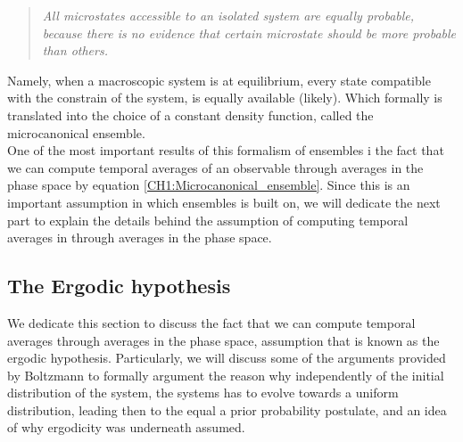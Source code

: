 \begin{quote}
\textit{All microstates accessible to an isolated system are equally probable, because there is no evidence that certain microstate should be more probable than others.}
\end{quote}
\indent Namely, when a macroscopic system is at equilibrium, every state compatible with the constrain of the system, is equally available (likely). Which formally is translated into the choice of a constant density function, called the microcanonical ensemble.\\
\indent One of the most important results of this formalism of ensembles i the fact that we can compute temporal averages of an observable through averages in the phase space by equation \eqref{CH1:Microcanonical_ensemble}. Since this is an important assumption in which ensembles is built on, we will dedicate the next part to explain the details behind the assumption of computing temporal averages in through averages in the phase space.
\subsection{The Ergodic hypothesis} 

We dedicate this section to discuss the fact that we can compute temporal averages through averages in the phase space,  assumption that is known as the ergodic hypothesis. Particularly, we will discuss some of the arguments provided by Boltzmann  \cite{boltzmann_zur_1871, boltzmann_einige_1871} to formally argument the reason why independently of the initial distribution of the system, the systems has to evolve towards a uniform distribution, leading then to the equal a prior probability postulate, and an idea of why ergodicity was underneath assumed.\\


